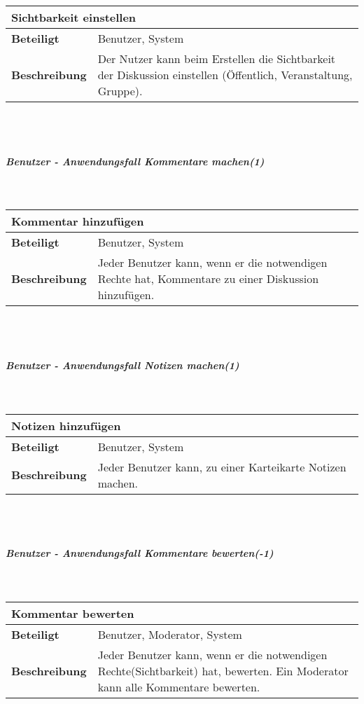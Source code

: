 \documentclass[12pt,a4paper]{article}
\begin{document}
\begin{tabular}{l p{10cm}}
\multicolumn{2}{l}{\textbf{Sichtbarkeit einstellen}} \\ \hline
\textbf{Beteiligt} & Benutzer, System \\ \hline 
\textbf{Beschreibung} & Der Nutzer kann beim Erstellen die Sichtbarkeit der Diskussion einstellen (Öffentlich, Veranstaltung, Gruppe).\\ 
\hline 
\end{tabular}\\\\
\subparagraph{Benutzer - Anwendungsfall \glqq Kommentare machen\grqq (1)}\mbox{}\\

\begin{tabular}{l p{10cm}}
\multicolumn{2}{l}{\textbf{Kommentar hinzufügen}} \\ \hline
\textbf{Beteiligt} & Benutzer, System \\ \hline 
\textbf{Beschreibung} & Jeder Benutzer kann, wenn er die notwendigen Rechte hat, Kommentare zu einer Diskussion hinzufügen.\\ 
\hline 
\end{tabular}\\\\
\subparagraph{Benutzer - Anwendungsfall \glqq Notizen machen\grqq (1)}\mbox{}\\

\begin{tabular}{l p{10cm}}
\multicolumn{2}{l}{\textbf{Notizen hinzufügen}} \\ \hline
\textbf{Beteiligt} & Benutzer, System \\ \hline 
\textbf{Beschreibung} & Jeder Benutzer kann, zu einer Karteikarte Notizen machen.\\ 
\hline 
\end{tabular}\\\\
\subparagraph{Benutzer - Anwendungsfall \glqq Kommentare bewerten\grqq (-1)}\mbox{}\\

\begin{tabular}{l p{10cm}}
\multicolumn{2}{l}{\textbf{Kommentar bewerten}} \\ \hline
\textbf{Beteiligt} & Benutzer, Moderator, System \\ \hline 
\textbf{Beschreibung} & Jeder Benutzer kann, wenn er die notwendigen Rechte(Sichtbarkeit) hat, bewerten. Ein Moderator kann alle Kommentare bewerten.\\ 
\hline 
\end{tabular}\\\\
\end{document}
